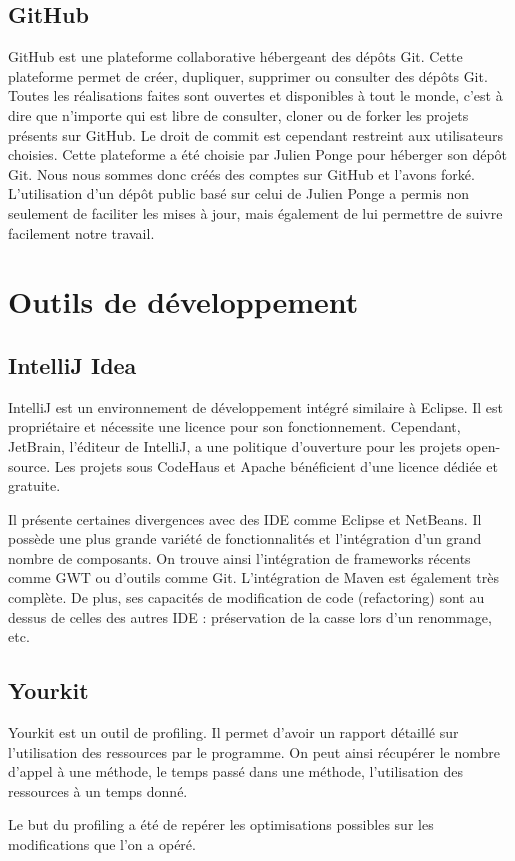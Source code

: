 \subsection{GitHub}
GitHub est une plateforme collaborative hébergeant des dépôts Git.
Cette plateforme permet de créer, dupliquer, supprimer ou consulter des dépôts Git.
Toutes les réalisations faites sont ouvertes et disponibles à tout le monde, c'est à dire que n'importe qui est libre de consulter, cloner ou de forker les projets présents sur GitHub.
Le droit de commit est cependant restreint aux utilisateurs choisies.
Cette plateforme a été choisie par Julien Ponge pour héberger son dépôt Git.
Nous nous sommes donc créés des comptes sur GitHub et l'avons forké.
L'utilisation d'un dépôt public basé sur celui de Julien Ponge a permis non seulement de faciliter les mises à jour, mais également de lui permettre de suivre facilement notre travail.
\section{Outils de développement}
\subsection{IntelliJ Idea}
IntelliJ est un environnement de développement intégré similaire à Eclipse.
Il est propriétaire et nécessite une licence pour son fonctionnement.
Cependant, JetBrain, l'éditeur de IntelliJ, a une politique d'ouverture pour les projets open-source.
Les projets sous CodeHaus et Apache bénéficient d'une licence dédiée et gratuite.

Il présente certaines divergences avec des IDE comme Eclipse et NetBeans.
Il possède une plus grande variété de fonctionnalités et l'intégration d'un grand nombre de composants.
On trouve ainsi l'intégration de frameworks récents comme GWT ou d'outils comme Git.
L'intégration de Maven est également très complète.
De plus, ses capacités de modification de code (refactoring) sont au dessus de celles des autres IDE : préservation de la casse lors d'un renommage, etc.
\subsection{Yourkit}
Yourkit est un outil de profiling. Il permet d'avoir un rapport détaillé sur l'utilisation des ressources par le programme. On peut ainsi récupérer le nombre d'appel à une méthode, le temps passé dans une méthode, l'utilisation des ressources à un temps donné.

Le but du profiling a été de repérer les optimisations possibles sur les modifications que l'on a opéré.